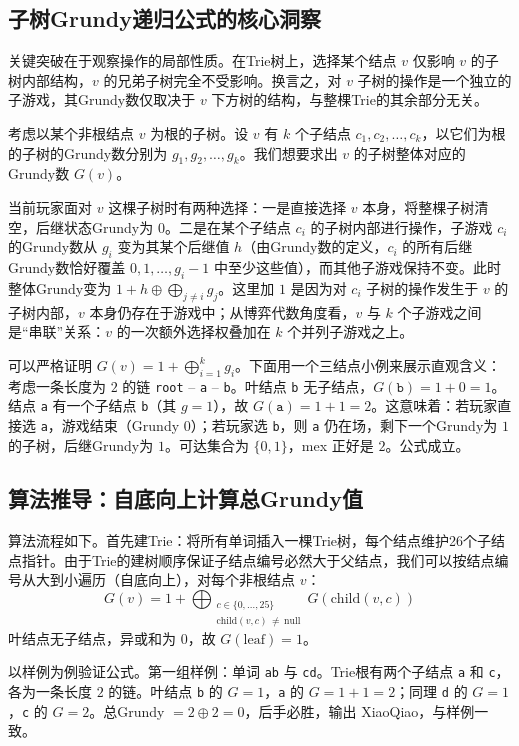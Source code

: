 \subsection{子树Grundy递归公式的核心洞察}

关键突破在于观察操作的局部性质。在Trie树上，选择某个结点 $v$ 仅影响 $v$ 的子树内部结构，$v$ 的兄弟子树完全不受影响。换言之，对 $v$ 子树的操作是一个独立的子游戏，其Grundy数仅取决于 $v$ 下方树的结构，与整棵Trie的其余部分无关。

考虑以某个非根结点 $v$ 为根的子树。设 $v$ 有 $k$ 个子结点 $c_1, c_2, \dots, c_k$，以它们为根的子树的Grundy数分别为 $g_1, g_2, \dots, g_k$。我们想要求出 $v$ 的子树整体对应的Grundy数 $G(v)$。

当前玩家面对 $v$ 这棵子树时有两种选择：一是直接选择 $v$ 本身，将整棵子树清空，后继状态Grundy为 $0$。二是在某个子结点 $c_i$ 的子树内部进行操作，子游戏 $c_i$ 的Grundy数从 $g_i$ 变为其某个后继值 $h$（由Grundy数的定义，$c_i$ 的所有后继Grundy数恰好覆盖 $0, 1, \dots, g_i - 1$ 中至少这些值），而其他子游戏保持不变。此时整体Grundy变为 $1 + h \oplus \bigoplus_{j \ne i} g_j$。这里加 $1$ 是因为对 $c_i$ 子树的操作发生于 $v$ 的子树内部，$v$ 本身仍存在于游戏中；从博弈代数角度看，$v$ 与 $k$ 个子游戏之间是“串联”关系：$v$ 的一次额外选择权叠加在 $k$ 个并列子游戏之上。

可以严格证明 $G(v) = 1 + \bigoplus_{i=1}^k g_i$。下面用一个三结点小例来展示直观含义：考虑一条长度为 $2$ 的链 \texttt{root} -- \texttt{a} -- \texttt{b}。叶结点 \texttt{b} 无子结点，$G(\texttt{b}) = 1 + 0 = 1$。结点 \texttt{a} 有一个子结点 \texttt{b}（其 $g = 1$），故 $G(\texttt{a}) = 1 + 1 = 2$。这意味着：若玩家直接选 \texttt{a}，游戏结束（Grundy 0）；若玩家选 \texttt{b}，则 \texttt{a} 仍在场，剩下一个Grundy为 $1$ 的子树，后继Grundy为 $1$。可达集合为 $\{0, 1\}$，mex 正好是 $2$。公式成立。

\subsection{算法推导：自底向上计算总Grundy值}

算法流程如下。首先建Trie：将所有单词插入一棵Trie树，每个结点维护26个子结点指针。由于Trie的建树顺序保证子结点编号必然大于父结点，我们可以按结点编号从大到小遍历（自底向上），对每个非根结点 $v$：
\[
G(v) = 1 + \bigoplus_{\substack{c \in \{0,\dots,25\} \\ \text{child}(v, c) \,\neq\, \text{null}}} G(\text{child}(v, c))
\]
叶结点无子结点，异或和为 $0$，故 $G(\text{leaf}) = 1$。

以样例为例验证公式。第一组样例：单词 \texttt{ab} 与 \texttt{cd}。Trie根有两个子结点 \texttt{a} 和 \texttt{c}，各为一条长度 $2$ 的链。叶结点 \texttt{b} 的 $G = 1$，\texttt{a} 的 $G = 1 + 1 = 2$；同理 \texttt{d} 的 $G = 1$，\texttt{c} 的 $G = 2$。总Grundy $= 2 \oplus 2 = 0$，后手必胜，输出 XiaoQiao，与样例一致。

